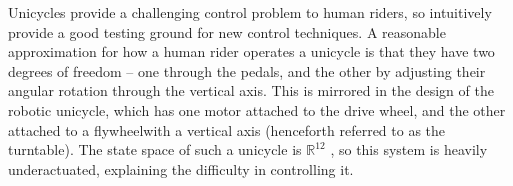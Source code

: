 \documentclass[main.tex]{subfiles}
\begin{document}
	Unicycles provide a challenging control problem to human riders, so intuitively provide a good testing ground for new control techniques.
	A reasonable approximation for how a human rider operates a unicycle is that they have two degrees of freedom -- one through the pedals, and the other by adjusting their angular rotation through the vertical axis.
	This is mirrored in the design of the robotic unicycle, which has one motor attached to the drive wheel, and the other attached to a flywheel\footnotemark with a vertical axis (henceforth referred to as the turntable).
	The state space of such a unicycle is $\mathbb{R}^{12}$ \cite{forster}, so this system is heavily underactuated, explaining the difficulty in controlling it.

\end{document}
